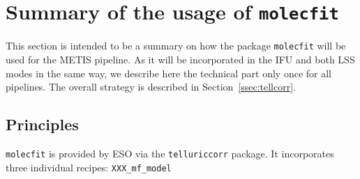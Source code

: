 \section{Summary of the usage of \texttt{molecfit}}\label{app:mf}
This section is intended to be a summary on how the package \texttt{molecfit} will be used for the METIS pipeline. As it will be incorporated in the \ac{IFU} and both \ac{LSS} modes in the same way, we describe here the technical part only once for all pipelines. The overall strategy is described in Section~\ref{ssec:tellcorr}.
\subsection{Principles}\label{app:mf_principles}
\texttt{molecfit} is provided by \ac{ESO} via the \texttt{telluriccorr} package. It incorporates three individual recipes: \texttt{XXX_mf_model}

